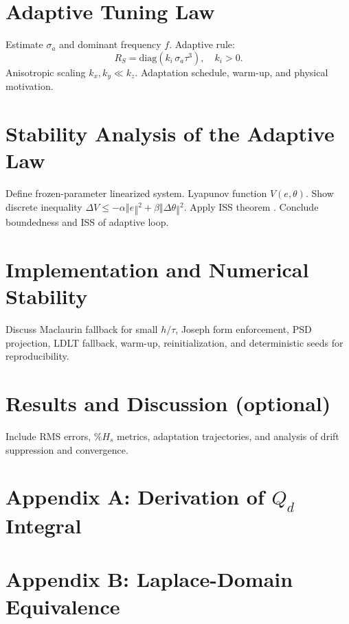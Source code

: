 \documentclass[10pt]{extarticle}
\begin{document}
\section{Adaptive Tuning Law}
\label{sec:adaptive}

Estimate $\sigma_a$ and dominant frequency $f$.
Adaptive rule:
\[
R_S = \mathrm{diag}(k_i\,\sigma_a\tau^3),\quad k_i>0.
\]
Anisotropic scaling $k_x,k_y\ll k_z$.
Adaptation schedule, warm-up, and physical motivation.

\section{Stability Analysis of the Adaptive Law}
\label{sec:stability}

Define frozen-parameter linearized system.
Lyapunov function $V(e,\theta)$.
Show discrete inequality $\Delta V\le-α‖e‖^2+β‖\Delta\theta‖^2$.
Apply ISS theorem
\cite{sontag1996,jiang1997}.
Conclude boundedness and ISS of adaptive loop.

\section{Implementation and Numerical Stability}
\label{sec:impl}

Discuss Maclaurin fallback for small $h/τ$,
Joseph form enforcement,
PSD projection,
LDLT fallback,
warm-up, reinitialization,
and deterministic seeds for reproducibility.

\section{Results and Discussion (optional)}
\label{sec:results}

Include RMS errors, $\%H_s$ metrics, adaptation trajectories,
and analysis of drift suppression and convergence.

\appendix
\section{Appendix A: Derivation of $Q_d$ Integral}
\label{app:qd_integral}

\section{Appendix B: Laplace-Domain Equivalence}
\label{app:laplace}
\end{document}
